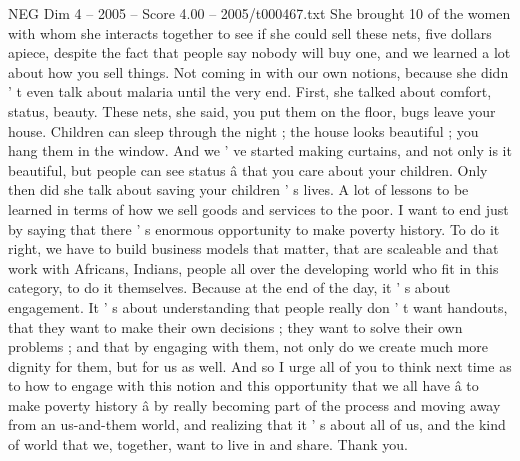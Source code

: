 \begin{textsample}{NEG Dim 4 – 2005 – Score 4.00 – 2005/t000467.txt}
She brought 10 of the women with whom she interacts together to see if she could sell these nets, five dollars apiece, despite the fact that people say nobody will buy one, and we learned a lot about how you sell things.
Not coming in with our own notions, because she didn ' t even talk about malaria until the very end.
First, she talked about comfort, status, beauty.
These nets, she said, you put them on the floor, bugs leave your house.
Children can sleep through the night ; the house looks beautiful ; you hang them in the window.
And we ' ve started making curtains, and not only is it beautiful, but people can see status â that you care about your children.
Only then did she talk about saving your children ' s lives.
A lot of lessons to be learned in terms of how we sell goods and services to the poor.
I want to end just by saying that there ' s enormous opportunity to make poverty history.
To do it right, we have to build business models that matter, that are scaleable and that work with Africans, Indians, people all over the developing world who fit in this category, to do it themselves.
Because at the end of the day, it ' s about engagement.
It ' s about understanding that people really don ' t want handouts, that they want to make their own decisions ; they want to solve their own problems ; and that by engaging with them, not only do we create much more dignity for them, but for us as well.
And so I urge all of you to think next time as to how to engage with this notion and this opportunity that we all have â to make poverty history â by really becoming part of the process and moving away from an us-and-them world, and realizing that it ' s about all of us, and the kind of world that we, together, want to live in and share.
Thank you.

\end{textsample}
